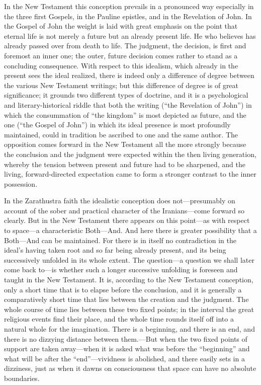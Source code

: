 \documentclass[12pt,a4paper]{book}
\newcommand{\opage}[1]{\marginnote{\footnotesize\textit{[#1]}}}
\begin{document}
In the New Testament this conception prevails in a pronounced way especially
in the three first Gospels, in the Pauline epistles, and in the Revelation of
John. In the Gospel of John the weight is laid with great emphasis on the
point that eternal life is not merely a future but an already present life.
He who believes has already passed over from death to life. The judgment, the
decision, is first and foremost an inner one; the outer, future decision
comes rather to stand as a concluding consequence. With respect to this
idealism, which already in the present sees the ideal realized, there is
indeed only a 
\opage{32}difference of degree between the various New Testament
writings; but this difference of degree is of great significance; it grounds
two different types of doctrine, and it is a psychological and
literary-historical riddle that both the writing (``the Revelation of John'')
in which the consummation of ``the kingdom'' is most depicted as future, and
the one (``the Gospel of John'') in which its ideal presence is most
profoundly maintained, could in tradition be ascribed to one and the same
author. The opposition comes forward in the New Testament all the more
strongly because the conclusion and the judgment were expected within the
then living generation, whereby the tension between present and future had to
be sharpened, and the living, forward-directed expectation came to form a
stronger contrast to the inner possession.

In the Zarathustra faith the idealistic conception does not---presumably on
account of the sober and practical character of the Iranians---come forward
so clearly. But in the New Testament there appears on this point---as with
respect to space---a characteristic Both---And. And here there is greater
possibility that a Both---And can be maintained. For there is in itself no
contradiction in the ideal's having taken root and so far being already
present, and its being successively unfolded in its whole extent. The
question---a question we shall later come back to---is whether such a longer
successive unfolding is foreseen and taught in the New Testament. It is,
according to the New Testament conception, only a short time that is to
elapse before the conclusion, and it is generally a comparatively short time
that lies between the creation and the judgment. The whole course of time
lies between these two fixed points; in the interval the great religious
events find their place, and the whole time rounds itself off into a natural
whole for the imagination. There is a beginning, and there is an end, and
there is no dizzying distance between them.---But when the two fixed points
of support are taken away---when it is asked what was before the
``beginning'' and what will be after the ``end''---vividness is abolished,
and there easily sets in a dizziness, just as when it dawns on consciousness
that space can have no absolute boundaries.
\end{document}
